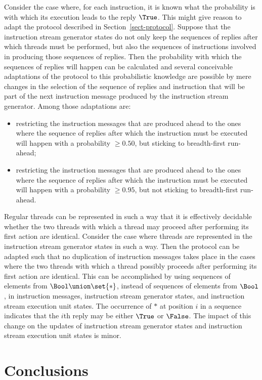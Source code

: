 \documentclass[fleqn]{llncs}
\begin{document}
Consider the case where, for each instruction, it is known what the
probability is with which its execution leads to the reply $\True$.
This might give reason to adapt the protocol described in
Section~\ref{sect-protocol}.
Suppose that the instruction stream generator states do not only keep
the sequences of replies after which threads must be performed, but also
the sequences of instructions involved in producing those sequences of
replies.
Then the probability with which the sequences of replies will happen can
be calculated and several conceivable adaptations of the protocol to
this probabilistic knowledge are possible by mere changes in the
selection of the sequence of replies and instruction that will be part
of the next instruction message produced by the instruction stream
generator.
Among those adaptations are:
\begin{itemize}
\item
restricting the instruction messages that are produced ahead to the ones
where the sequence of replies after which the instruction must be
executed will happen with a probability $\geq 0.50$, but sticking to
breadth-first run-ahead;
\item
restricting the instruction messages that are produced ahead to the ones
where the sequence of replies after which the instruction must be
executed will happen with a probability $\geq 0.95$, but not sticking to
breadth-first run-ahead.
\end{itemize}

Regular threads can be represented in such a way that it is effectively
decidable whether the two threads with which a thread may proceed after
performing its first action are identical.
Consider the case where threads are represented in the instruction
stream generator states in such a way.
Then the protocol can be adapted such that no duplication of instruction
messages takes place in the cases where the two threads with which a
thread possibly proceeds after performing its first action are
identical.
This can be accomplished by using sequences of elements from
$\Bool \union \set{*}$, instead of sequences of elements from $\Bool$,
in instruction messages, instruction stream generator states, and
instruction stream execution unit states.
The occurrence of $*$ at position $i$ in a sequence indicates that the
$i$th reply may be either $\True$ or $\False$.
The impact of this change on the updates of instruction stream generator
states and instruction stream execution unit states is minor.

\section{Conclusions}
\label{sect-concl}
\end{document}
